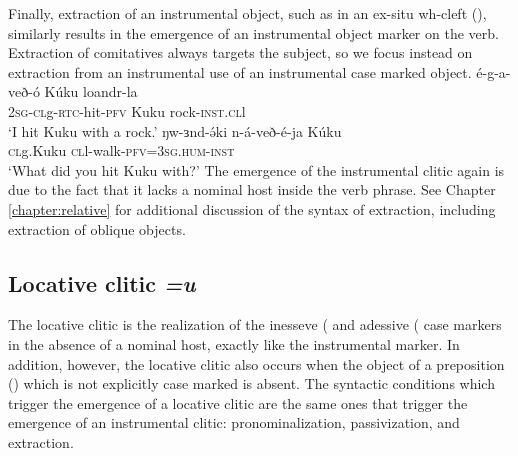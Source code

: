 Finally, extraction of an instrumental object, such as in an ex-situ wh-cleft (), similarly results in the emergence of an instrumental object marker on the verb. Extraction of comitatives always targets the subject, so we focus instead on extraction from an instrumental use of an instrumental case marked object. 
\ea \ea 
		\gll	 é-g-a-veð-ó       Kúku loandr-la\\
				\textsc{2sg-cl}g-\textsc{rtc}-hit-\textsc{pfv} Kuku rock-\textsc{inst.cl}l		\\
		\glt `I hit Kuku with a rock.'
		\ex 
		\gll	 ŋw-ɜnd-ə́ki      n-á-veð-é-ja Kúku  	\\
				\textsc{cl}g.Kuku \textsc{cl}l-walk-\textsc{pfv}=\textsc{3sg.hum}-\textsc{inst}		\\
		\glt `What did you hit Kuku with?'
	\z
\z
The emergence of the instrumental clitic again is due to the fact that it lacks a nominal host inside the verb phrase. See Chapter \ref{chapter:relative} for additional discussion of the syntax of extraction, including extraction of oblique objects.


\subsection{Locative clitic \textit{=u}}\label{sec:ch11:locative}

The locative clitic is the realization of the inesseve ( and adessive ( case markers in the absence of a nominal host, exactly like the instrumental marker. In addition, however, the locative clitic also occurs when the object of a preposition () which is not explicitly case marked is absent. The syntactic conditions which trigger the emergence of a locative clitic are the same ones that trigger the emergence of an instrumental clitic: pronominalization, passivization, and extraction.

